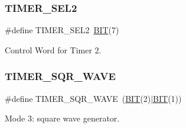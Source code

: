 \subsubsection{\texorpdfstring{T\+I\+M\+E\+R\+\_\+\+S\+E\+L2}{TIMER\_SEL2}}
{\footnotesize\ttfamily \#define T\+I\+M\+E\+R\+\_\+\+S\+E\+L2~\mbox{\hyperlink{group__vbe_ga3a8ea58898cb58fc96013383d39f482c}{B\+IT}}(7)}



Control Word for Timer 2. 

\mbox{\label{group__i8254_ga4745cbf21da3d3fea5dbb080b2b73bac}} 
\subsubsection{\texorpdfstring{T\+I\+M\+E\+R\+\_\+\+S\+Q\+R\+\_\+\+W\+A\+VE}{TIMER\_SQR\_WAVE}}
{\footnotesize\ttfamily \#define T\+I\+M\+E\+R\+\_\+\+S\+Q\+R\+\_\+\+W\+A\+VE~(\mbox{\hyperlink{group__vbe_ga3a8ea58898cb58fc96013383d39f482c}{B\+IT}}(2)$\vert$\mbox{\hyperlink{group__vbe_ga3a8ea58898cb58fc96013383d39f482c}{B\+IT}}(1))}



Mode 3\+: square wave generator. 

